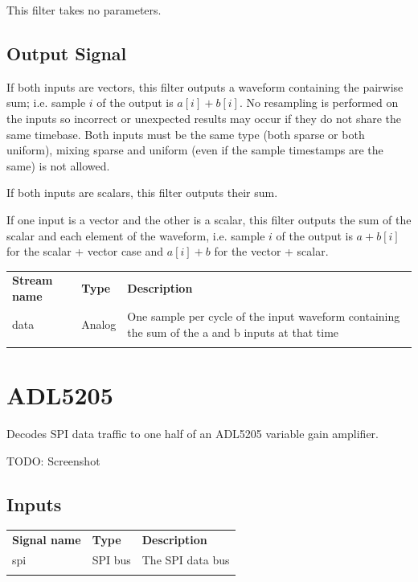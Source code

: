 This filter takes no parameters.

\subsection{Output Signal}

If both inputs are vectors, this filter outputs a waveform containing the pairwise sum; i.e. sample $i$ of the output
is $a[i] + b[i]$. No resampling is performed on the inputs so incorrect or unexpected results may occur if they do not
share the same timebase. Both inputs must be the same type (both sparse or both uniform), mixing sparse and uniform
(even if the sample timestamps are the same) is not allowed.

If both inputs are scalars, this filter outputs their sum.

If one input is a vector and the other is a scalar, this filter outputs the sum  of the scalar and each element of the
waveform, i.e. sample $i$ of the output is $a + b[i]$ for the scalar + vector case and $a[i] + b$ for the vector +
scalar.

\begin{tabularx}{16cm}{llX}
\thickhline
\textbf{Stream name} & \textbf{Type} & \textbf{Description} \\
\thickhline
data & Analog & One sample per cycle of the input waveform containing the sum of the a and b inputs at that time \\
\thickhline
\end{tabularx}

\pagebreak
\section{ADL5205}
\label{filter:adl5205}

Decodes SPI data traffic to one half of an ADL5205 variable gain amplifier.

TODO: Screenshot

\subsection{Inputs}

\begin{tabularx}{16cm}{llX}
\thickhline
\textbf{Signal name} & \textbf{Type} & \textbf{Description} \\
\thickhline
spi & SPI bus & The SPI data bus \\
\thickhline
\end{tabularx}

